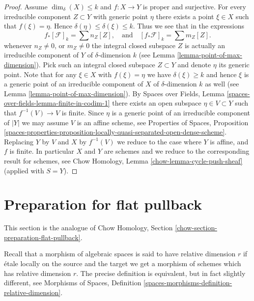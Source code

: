 \documentclass{stacks-project}
\theoremstyle{plain}
\theoremstyle{definition}
\theoremstyle{remark}
\numberwithin{equation}{subsection}
\begin{document}
\begin{proof}
\medskip\noindent
Assume $\dim_\delta(X) \leq k$ and $f : X \to Y$ is proper and surjective.
For every irreducible component $Z \subset Y$
with generic point $\eta$ there exists a point $\xi \in X$ such
that $f(\xi) = \eta$. Hence $\delta(\eta) \leq \delta(\xi) \leq k$.
Thus we see that in the expressions
$$
f_*[\mathcal{F}]_k = \sum n_Z[Z],
\quad
\text{and}
\quad
[f_*\mathcal{F}]_k = \sum m_Z[Z].
$$
whenever $n_Z \not = 0$, or $m_Z \not = 0$ the integral closed
subspace $Z$ is actually an irreducible component of $Y$ of
$\delta$-dimension $k$ (see Lemma \ref{lemma-point-of-max-dimension}).
Pick such an integral closed subspace $Z \subset Y$ and denote $\eta$
its generic point.
Note that for any $\xi \in X$ with $f(\xi) = \eta$ we have $\delta(\xi) \geq k$
and hence $\xi$ is a generic point of an irreducible component
of $X$ of $\delta$-dimension $k$ as well
(see Lemma \ref{lemma-point-of-max-dimension}).
By Spaces over Fields, Lemma \ref{spaces-over-fields-lemma-finite-in-codim-1}
there exists an open subspace $\eta \in V \subset Y$
such that $f^{-1}(V) \to V$ is finite.
Since $\eta$ is a generic point of an irreducible component of
$|Y|$ we may assume $V$ is an affine scheme, see
Properties of Spaces, Proposition
\ref{spaces-properties-proposition-locally-quasi-separated-open-dense-scheme}.
Replacing $Y$ by $V$ and $X$ by $f^{-1}(V)$ we reduce to the
case where $Y$ is affine, and $f$ is finite.
In particular $X$ and $Y$ are schemes and we reduce to
the corresponding result for schemes, see
Chow Homology, Lemma \ref{chow-lemma-cycle-push-sheaf}
(applied with $S = Y$).
\end{proof}













\section{Preparation for flat pullback}
\label{section-preparation-flat-pullback}

\noindent
This section is the analogue of
Chow Homology, Section \ref{chow-section-preparation-flat-pullback}.

\medskip\noindent
Recall that a morphism of algebraic spaces is said to have
relative dimension $r$ if \'etale locally on the source
and the target we get a morphism of schemes which has relative dimension $r$.
The precise definition is equivalent, but in fact slightly different, see
Morphisms of Spaces, Definition
\ref{spaces-morphisms-definition-relative-dimension}.
\end{document}
